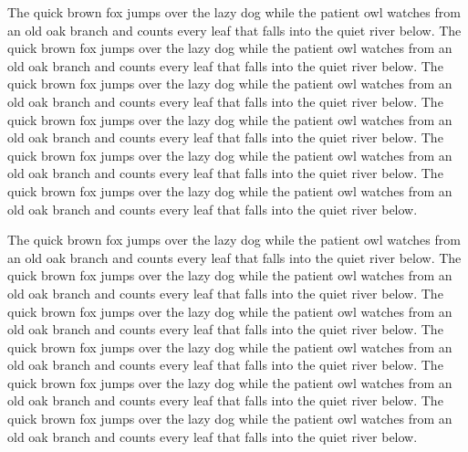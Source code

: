 The quick brown fox jumps over the lazy dog while the patient owl watches from an old oak branch and counts every leaf that falls into the quiet river below. The quick brown fox jumps over the lazy dog while the patient owl watches from an old oak branch and counts every leaf that falls into the quiet river below. The quick brown fox jumps over the lazy dog while the patient owl watches from an old oak branch and counts every leaf that falls into the quiet river below. The quick brown fox jumps over the lazy dog while the patient owl watches from an old oak branch and counts every leaf that falls into the quiet river below. The quick brown fox jumps over the lazy dog while the patient owl watches from an old oak branch and counts every leaf that falls into the quiet river below. The quick brown fox jumps over the lazy dog while the patient owl watches from an old oak branch and counts every leaf that falls into the quiet river below.

The quick brown fox jumps over the lazy dog while the patient owl watches from an old oak branch and counts every leaf that falls into the quiet river below. The quick brown fox jumps over the lazy dog while the patient owl watches from an old oak branch and counts every leaf that falls into the quiet river below. The quick brown fox jumps over the lazy dog while the patient owl watches from an old oak branch and counts every leaf that falls into the quiet river below. The quick brown fox jumps over the lazy dog while the patient owl watches from an old oak branch and counts every leaf that falls into the quiet river below. The quick brown fox jumps over the lazy dog while the patient owl watches from an old oak branch and counts every leaf that falls into the quiet river below. The quick brown fox jumps over the lazy dog while the patient owl watches from an old oak branch and counts every leaf that falls into the quiet river below.

